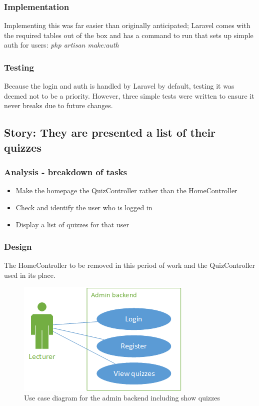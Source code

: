 \subsubsection{Implementation}
Implementing this was far easier than originally anticipated; Laravel comes with the required tables out of the box and has a command to run that sets up simple auth for users: \textit{php artisan make:auth} 
\subsubsection{Testing}
Because the login and auth is handled by Laravel by default, testing it was deemed not to be a priority. However, three simple tests were written to ensure it never breaks due to future changes.
\newpage

\subsection{Story: They are presented a list of their quizzes}
\subsubsection{Analysis - breakdown of tasks}
\begin{itemize}
	\item Make the homepage the QuizController rather than the HomeController
	\item Check and identify the user who is logged in
	\item Display a list of quizzes for that user
\end{itemize}
\subsubsection{Design}
The HomeController to be removed in this period of work and the QuizController used in its place.

\begin{figure}[H]
	\caption{Use case diagram for the admin backend including show quizzes}
	\centerline{\includegraphics{Chapter2/Iter-1/iter-1-use-case-v2}}
	\label{fig:quiz-list-use-case}
\end{figure}

